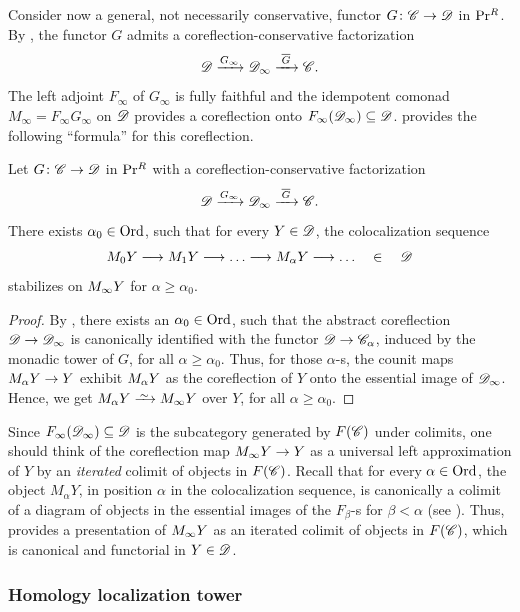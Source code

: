 \documentclass[english]{article}
\begin{document}
Consider now a general, not necessarily conservative, functor $G\colon \mathscr{C} \to \mathscr{D}$ in $\mathrm{Pr}{}^R$. By , the functor $G$ admits a coreflection-conservative factorization
\[
    \mathscr{D} \xrightarrow{G_\infty} \mathscr{D}_\infty \xrightarrow{\;\overline{G}\;} \mathscr{C}.
\]
The left adjoint $F_\infty$ of $G_\infty$ is fully faithful and the idempotent comonad $M_\infty = F_\infty G_\infty$ on $\mathscr{D}$ provides a coreflection onto $F_\infty (\mathscr{D}_\infty) \subseteq \mathscr{D}$.
 provides the following ``formula'' for this coreflection.

\begin{cor}\label{Iterated_Colimit_Functorial}
    Let $G\colon \mathscr{C} \to \mathscr{D}$ in $\mathrm{Pr}{}^R$ with a coreflection-conservative factorization
    \[
        \mathscr{D} \xrightarrow{G_\infty} \mathscr{D}_\infty \xrightarrow{\;\overline{G}\;} \mathscr{C}.
    \]
    There exists $\alpha_0 \in \mathrm{Ord}$, such that for every $Y\in\mathscr{D}$, the colocalization sequence
    \[
        \comnd_0 Y \lto \comnd_1 Y \lto \dots \lto \comnd_\alpha Y \lto \dots
        \qin \cD
    \]
    stabilizes on $M_\infty Y$ for $\alpha \ge \alpha_0$.
\end{cor}
\begin{proof}
    By , there exists an $\alpha_0\in\mathrm{Ord}$, such that the abstract coreflection $\mathscr{D} \to \mathscr{D}_\infty$ is canonically identified with the functor $\mathscr{D} \to \mathscr{C}_{\alpha}$, induced by the monadic tower of $G$, for all $\alpha \ge \alpha_0$. Thus, for those $\alpha$-s, the counit maps $M_\alpha Y \to Y$ exhibit $M_\alpha Y$ as the coreflection of $Y$ onto the essential image of $\mathscr{D}_\infty$. Hence, we get $M_\alpha Y \iso M_\infty Y$ over $Y$, for all $\alpha \ge \alpha_0$.
\end{proof}

Since $F_\infty(\mathscr{D}_\infty)\subseteq \mathscr{D}$ is the subcategory generated by $F(\mathscr{C})$ under colimits, one should think of the coreflection map $M_\infty Y \to Y$ as a universal left approximation of $Y$ by an \textit{iterated} colimit of objects in $F(\mathscr{C})$.
Recall that for every $\alpha\in\mathrm{Ord}$, the object $M_\alpha Y$, in position $\alpha$ in the colocalization sequence, is canonically a colimit of a diagram of objects in the essential images of the $F_\beta$-s for $\beta < \alpha$ (see ). Thus,  provides a presentation of $M_\infty Y$ as an iterated colimit of objects in $F(\mathscr{C})$, which is canonical and functorial in $Y\in\mathscr{D}$.


\subsubsection{Homology localization tower}
\end{document}
